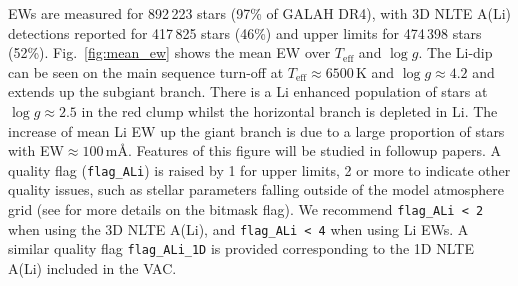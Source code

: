 \documentclass[
  journal=pasa,
  manuscript=research-paper, %
  year=2024,
  volume=37
]{cup-journal}
\newcommand{\Teff}{$T_\mathrm{eff}$\xspace}
\newcommand{\logg}{$\log g$\xspace}
\begin{document}


EWs are measured for 892\,223 stars (97\% of GALAH DR4), with 3D NLTE A(Li) detections reported for 417\,825 stars (46\%) and upper limits for 474\,398 stars (52\%). Fig.~\ref{fig:mean_ew} shows the mean EW over \Teff and \logg. The Li-dip can be seen on the main sequence turn-off at \Teff$\approx 6500$\,K and \logg$\approx 4.2$ and extends up the subgiant branch. There is a Li enhanced population of stars at \logg$\approx 2.5$ in the red clump whilst the horizontal branch is depleted in Li. The increase of mean Li EW up the giant branch is due to a large proportion of stars with EW$\approx 100$\,m\AA. Features of this figure will be studied in followup papers. 
A quality flag (\texttt{flag\_ALi}) is raised by 1 for upper limits, 2 or more to indicate other quality issues, such as stellar parameters falling outside of the model atmosphere grid (see \citet{Wang2024} for more details on the bitmask flag). We recommend \texttt{flag\_ALi < 2} when using the 3D NLTE A(Li), and \texttt{flag\_ALi < 4} when using Li EWs. A similar quality flag \texttt{flag\_ALi\_1D} is provided corresponding to the 1D NLTE A(Li) included in the VAC. 
\end{document}
